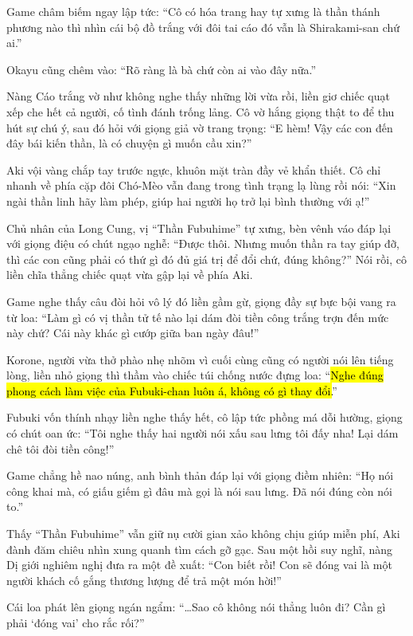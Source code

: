 \documentclass[../main.tex]{subfiles}
\begin{document}
Game châm biếm ngay lập tức: ``Cô có hóa trang hay tự xưng là thần thánh phương nào thì nhìn cái bộ đồ trắng với đôi tai cáo đó vẫn là Shirakami-san chứ ai.''

Okayu cũng chêm vào: ``Rõ ràng là bà chứ còn ai vào đây nữa.''

Nàng Cáo trắng vờ như không nghe thấy những lời vừa rồi, liền giơ chiếc quạt xếp che hết cả người, cố tình đánh trống lảng. Cô vờ hắng giọng thật to để thu hút sự chú ý, sau đó hỏi với giọng giả vờ trang trọng: ``E hèm! Vậy các con đến đây bái kiến thần, là có chuyện gì muốn cầu xin?''

Aki vội vàng chắp tay trước ngực, khuôn mặt tràn đầy vẻ khẩn thiết. Cô chỉ nhanh về phía cặp đôi Chó-Mèo vẫn đang trong tình trạng lạ lùng rồi nói: ``Xin ngài thần linh hãy làm phép, giúp hai người họ trở lại bình thường với ạ!''


Chủ nhân của Long Cung, vị ``Thần Fubuhime'' tự xưng, bèn vênh váo đáp lại với giọng điệu có chút ngạo nghễ: ``Được thôi. Nhưng muốn thần ra tay giúp đỡ, thì các con cũng phải có thứ gì đó đủ giá trị để đổi chứ, đúng không?'' Nói rồi, cô liền chĩa thẳng chiếc quạt vừa gập lại về phía Aki.

Game nghe thấy câu đòi hỏi vô lý đó liền gầm gừ, giọng đầy sự bực bội vang ra từ loa: ``Làm gì có vị thần tử tế nào lại dám đòi tiền công trắng trợn đến mức này chứ? Cái này khác gì cướp giữa ban ngày đâu!''

Korone, người vừa thở phào nhẹ nhõm vì cuối cùng cũng có người nói lên tiếng lòng, liền nhỏ giọng thì thầm vào chiếc túi chống nước đựng loa: ``\hl{Nghe đúng phong cách làm việc của Fubuki-chan luôn á, không có gì thay đổi.}''

Fubuki vốn thính nhạy liền nghe thấy hết, cô lập tức phồng má dỗi hường, giọng có chút oan ức: ``Tôi nghe thấy hai người nói xấu sau lưng tôi đấy nha! Lại dám chê tôi đòi tiền công!''

Game chẳng hề nao núng, anh bình thản đáp lại với giọng điềm nhiên: ``Họ nói công khai mà, có giấu giếm gì đâu mà gọi là nói sau lưng. Đã nói đúng còn nói to.''

Thấy ``Thần Fubuhime'' vẫn giữ nụ cười gian xảo không chịu giúp miễn phí, Aki đành đăm chiêu nhìn xung quanh tìm cách gỡ gạc. Sau một hồi suy nghĩ, nàng Dị giới nghiêm nghị đưa ra một đề xuất: ``Con biết rồi! Con sẽ đóng vai là một người khách cố gắng thương lượng để trả một món hời!''

Cái loa phát lên giọng ngán ngẩm: ``\dots Sao cô không nói thẳng luôn đi? Cần gì phải `đóng vai' cho rắc rối?''
\end{document}
